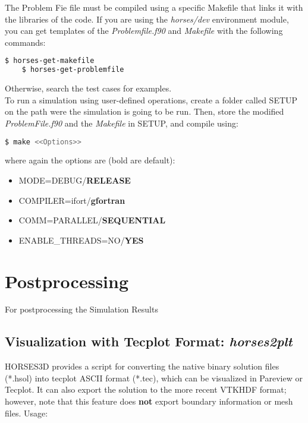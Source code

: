 \documentclass[a4paper,10pt]{report}
\begin{document}
The Problem Fie file must be compiled using a specific Makefile that links it with the libraries of the code. If you are using the \textit{horses/dev} environment module, you can get templates of the \textit{Problemfile.f90} and \textit{Makefile} with the following commands:

\begin{lstlisting}[language=bash]
	$ horses-get-makefile
	$ horses-get-problemfile
\end{lstlisting}

Otherwise, search the test cases for examples.\\

To run a simulation using user-defined operations, create a folder called SETUP on the path were the simulation is going to be run. Then, store the modified \textit{ProblemFile.f90} and the \textit{Makefile} in SETUP, and compile using:

\begin{lstlisting}[language=bash]
	$ make <<Options>>
\end{lstlisting}
where again the options are (bold are default):
\begin{itemize}
\item MODE=DEBUG/\textbf{RELEASE}
\item COMPILER=ifort/\textbf{gfortran}
\item COMM=PARALLEL/\textbf{SEQUENTIAL}
\item ENABLE\_THREADS=NO/\textbf{YES}
\end{itemize}


\chapter{Postprocessing}

For postprocessing the Simulation Results

\section{Visualization with Tecplot Format: \textit{horses2plt}}

HORSES3D provides a script for converting the native binary solution files (*.hsol) into tecplot ASCII format (*.tec), which can be visualized in Pareview or Tecplot. It can also export the solution to the more recent VTKHDF format; however, note that this feature does \textbf{not} export boundary information or mesh files. Usage:
\end{document}
